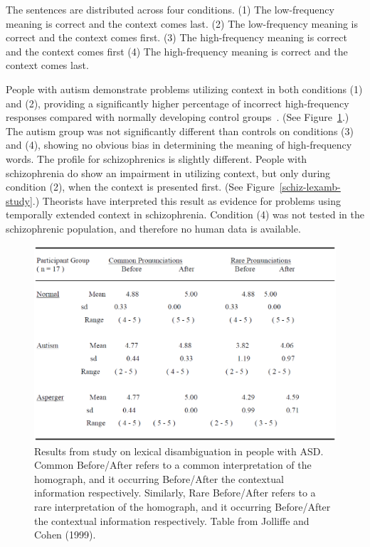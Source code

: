 The sentences are distributed across four conditions.  (1)  The low-frequency meaning is correct and the context comes last. (2)  The low-frequency meaning is correct and the context comes first.  (3)  The high-frequency meaning is correct and the context comes first (4) The high-frequency meaning is correct and the context comes last.

People with autism demonstrate problems utilizing context in both conditions (1) and (2), providing a significantly higher percentage of incorrect high-frequency responses compared with normally developing control groups~\cite{RefWorks:103,HappeF:1997:WCC_Homographs}.  (See Figure~\ref{asd-lexamb-study}.)  The autism group was not significantly different than controls on conditions (3) and (4), showing no obvious bias in determining the meaning of high-frequency words.  The profile for schizophrenics is slightly different.  People with schizophrenia do show an impairment in utilizing context, but only during condition (2), when the context is presented first. (See Figure~\ref{schiz-lexamb-study}.)  Theorists have interpreted this result as evidence for problems using temporally extended context in schizophrenia.  Condition (4) was not tested in the schizophrenic population, and therefore no human data is available.  

\begin{figure}[tp]
\begin{center}
	\includegraphics[width=115mm]{figures/asd_lexamb_study_results.eps}
\end{center}
\caption{Results from study on lexical disambiguation in people with ASD.  Common Before/After refers to a common interpretation of the homograph, and it occurring Before/After the contextual information respectively.  Similarly, Rare Before/After refers to a rare interpretation of the homograph, and it occurring Before/After the contextual information respectively.  Table from Jolliffe and Cohen (1999).}
\label{asd-lexamb-study}
\end{figure} 

